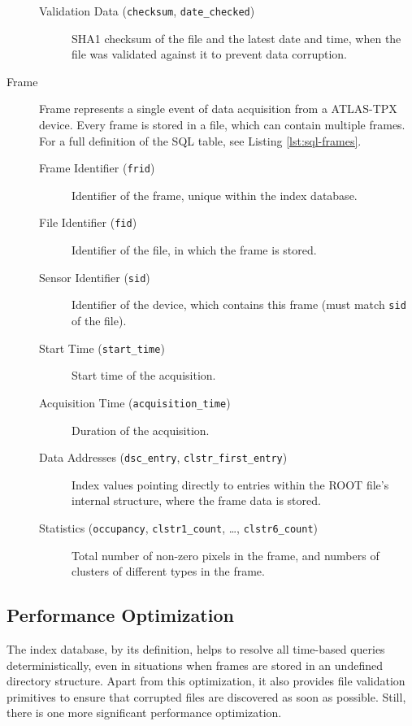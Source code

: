 \begin{description}
\begin{description}
		\item[Validation Data (\texttt{checksum}, \texttt{date\_checked})]
		SHA1 checksum of the file and the latest date and time, when the file was validated against it to prevent data corruption.
	\end{description}

	\item[Frame]
	Frame represents a single event of data acquisition from a ATLAS-TPX device. Every frame is stored in a file, which can contain multiple frames. For a full definition of the SQL table, see Listing \ref{lst:sql-frames}.

	\begin{description}
		\item[Frame Identifier (\texttt{frid})] 
		Identifier of the frame, unique within the index database.

		\item[File Identifier (\texttt{fid})]
		Identifier of the file, in which the frame is stored.

		\item[Sensor Identifier (\texttt{sid})] 
		Identifier of the device, which contains this frame (must match \texttt{sid} of the file).

		\item[Start Time (\texttt{start\_time})] 
		Start time of the acquisition.

		\item[Acquisition Time (\texttt{acquisition\_time})] 
		Duration of the acquisition.

		\item[Data Addresses (\texttt{dsc\_entry}, \texttt{clstr\_first\_entry})]
		Index values pointing directly to entries within the ROOT file's internal structure, where the frame data is stored.

		\item[Statistics (\texttt{occupancy}, \texttt{clstr1\_count}, \dots, \texttt{clstr6\_count})]
		Total number of non-zero pixels in the frame, and numbers of clusters of different types in the frame.
	\end{description}
\end{description}

\subsection{Performance Optimization}
\label{db:performance-optimization}
The index database, by its definition, helps to resolve all time-based queries deterministically, even in situations when frames are stored in an undefined directory structure. Apart from this optimization, it also provides file validation primitives to ensure that corrupted files are discovered as soon as possible. Still, there is one more significant performance optimization.

